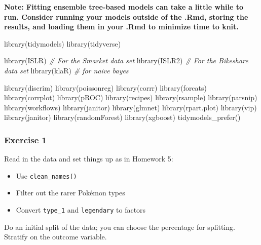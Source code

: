 \documentclass[
]{article}
\newenvironment{Shaded}{\begin{snugshade}}{\end{snugshade}}
\newcommand{\CommentTok}[1]{\textcolor[rgb]{0.56,0.35,0.01}{\textit{#1}}}
\newcommand{\FunctionTok}[1]{\textcolor[rgb]{0.00,0.00,0.00}{#1}}
\newcommand{\NormalTok}[1]{#1}
\providecommand{\tightlist}{%
  \setlength{\itemsep}{0pt}\setlength{\parskip}{0pt}}
\begin{document}
\textbf{Note: Fitting ensemble tree-based models can take a little while
to run. Consider running your models outside of the .Rmd, storing the
results, and loading them in your .Rmd to minimize time to knit.}

\begin{Shaded}
\begin{Highlighting}[]
\FunctionTok{library}\NormalTok{(tidymodels)}
\FunctionTok{library}\NormalTok{(tidyverse)}

\FunctionTok{library}\NormalTok{(ISLR) }\CommentTok{\# For the Smarket data set}
\FunctionTok{library}\NormalTok{(ISLR2) }\CommentTok{\# For the Bikeshare data set}
\FunctionTok{library}\NormalTok{(klaR) }\CommentTok{\# for naive bayes}

\FunctionTok{library}\NormalTok{(discrim)}
\FunctionTok{library}\NormalTok{(poissonreg)}
\FunctionTok{library}\NormalTok{(corrr)}
\FunctionTok{library}\NormalTok{(forcats)}
\FunctionTok{library}\NormalTok{(corrplot)}
\FunctionTok{library}\NormalTok{(pROC)}
\FunctionTok{library}\NormalTok{(recipes)}
\FunctionTok{library}\NormalTok{(rsample)}
\FunctionTok{library}\NormalTok{(parsnip)}
\FunctionTok{library}\NormalTok{(workflows)}
\FunctionTok{library}\NormalTok{(janitor)}
\FunctionTok{library}\NormalTok{(glmnet)}
\FunctionTok{library}\NormalTok{(rpart.plot)}
\FunctionTok{library}\NormalTok{(vip)}
\FunctionTok{library}\NormalTok{(janitor)}
\FunctionTok{library}\NormalTok{(randomForest)}
\FunctionTok{library}\NormalTok{(xgboost)}
\FunctionTok{tidymodels\_prefer}\NormalTok{()}
\end{Highlighting}
\end{Shaded}

\hypertarget{exercise-1}{%
\subsubsection{Exercise 1}\label{exercise-1}}

Read in the data and set things up as in Homework 5:

\begin{itemize}
\tightlist
\item
  Use \texttt{clean\_names()}
\item
  Filter out the rarer Pokémon types
\item
  Convert \texttt{type\_1} and \texttt{legendary} to factors
\end{itemize}

Do an initial split of the data; you can choose the percentage for
splitting. Stratify on the outcome variable.
\end{document}
